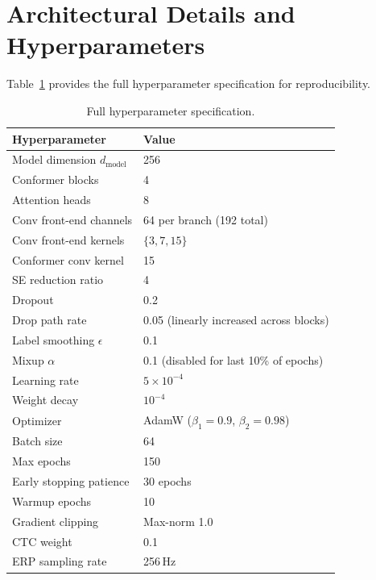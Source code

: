 \documentclass[11pt,a4paper]{article}
\begin{document}
\section{Architectural Details and Hyperparameters}

Table~\ref{tab:hyperparams} provides the full hyperparameter specification for
reproducibility.

\begin{table}[H]
\centering
\caption{Full hyperparameter specification.}
\label{tab:hyperparams}
\begin{tabular}{ll}
\toprule
\textbf{Hyperparameter} & \textbf{Value} \\
\midrule
Model dimension $d_{\text{model}}$ & 256 \\
Conformer blocks                   & 4 \\
Attention heads                    & 8 \\
Conv front-end channels            & 64 per branch (192 total) \\
Conv front-end kernels             & $\{3, 7, 15\}$ \\
Conformer conv kernel              & 15 \\
SE reduction ratio                 & 4 \\
Dropout                            & 0.2 \\
Drop path rate                     & 0.05 (linearly increased across blocks) \\
Label smoothing $\epsilon$         & 0.1 \\
Mixup $\alpha$                     & 0.1 (disabled for last 10\% of epochs) \\
Learning rate                      & $5 \times 10^{-4}$ \\
Weight decay                       & $10^{-4}$ \\
Optimizer                          & AdamW ($\beta_1 = 0.9$, $\beta_2 = 0.98$) \\
Batch size                         & 64 \\
Max epochs                         & 150 \\
Early stopping patience            & 30 epochs \\
Warmup epochs                      & 10 \\
Gradient clipping                  & Max-norm 1.0 \\
CTC weight                         & 0.1 \\
ERP sampling rate                  & 256\,Hz \\

\end{tabular}
\end{table}
\end{document}
